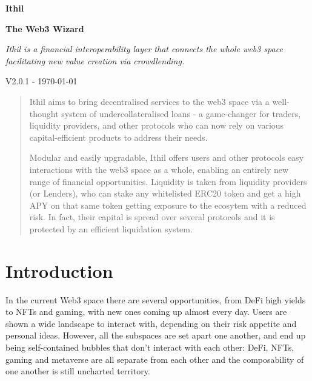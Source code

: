 \documentclass[a4paper,10 pt]{article}
\theoremstyle{definition}
\begin{document}
\begin{titlepage}
    \begin{center}
        \vspace*{1cm}
            
        \Huge
        \textbf{Ithil}

        \vspace{0.5cm}
        \Large
        {\bf The Web3 Wizard}

        \vspace{1cm}
        \Large
        {\it Ithil is a financial interoperability layer that connects the whole web3 space facilitating new value creation via crowdlending.}

        \vspace{1.5cm}
        {\normalsize V2.0.1 - \today}
        \vspace{1.0cm}

        \begin{abstract}        
        Ithil aims to bring decentralised services to the web3 space via a well-thought system of undercollateralised loans - a game-changer for traders, liquidity providers, and other protocols who can now rely on various capital-efficient products to address their needs. 
        
        Modular and easily upgradable, Ithil offers users and other protocols easy interactions with the web3 space as a whole, enabling an entirely new range of financial opportunities. Liquidity is taken from liquidity providers (or Lenders), who can stake any whitelisted ERC20 token and get a high APY on that same token getting exposure to the ecosytem with a reduced risk. In fact, their capital is spread over several protocols and it is protected by an efficient liquidation system.
        \end{abstract}
            
    \end{center}
\tableofcontents
\end{titlepage}

\section{Introduction}

In the current Web3 space there are several opportunities, from DeFi high yields to NFTs and gaming, with new ones coming up almost every day. Users are shown a wide landscape to interact with, depending on their risk appetite and personal ideas. However, all the subspaces are set apart one another, and end up being self-contained bubbles that don't interact with each other: DeFi, NFTs, gaming and metaverse are all separate from each other and the composability of one another is still uncharted territory.
\end{document}
